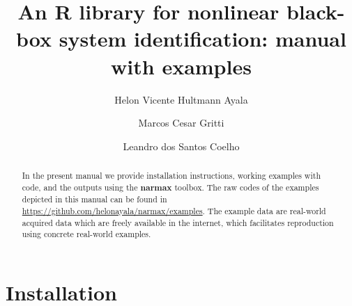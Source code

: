 \documentclass[preprint,12pt, a4paper]{elsarticle}
\begin{document}
\begin{frontmatter}

\title{An \textbf{R} library for nonlinear black-box system identification: manual with examples}

\author[pucrio,ppgeps]{Helon Vicente Hultmann Ayala}
\author[ufpr]{Marcos Cesar Gritti}
\author[ppgeps,ufpr]{Leandro dos Santos Coelho}
\address[pucrio]{Department of Mechanical Engineering, Pontifical Catholic University of Rio de Janeiro (PUC-Rio)\\ Marques de Sao Vicente, 225, Zip code 22453-900, Rio de Janeiro, RJ, Brazil}
\address[ppgeps]{Industrial and Systems Engineering Graduate Program (PPGEPS), Pontifical Catholic University of Parana (PUCPR)\\ Imaculada Conceicao, 1155, Zip code 80215-901, Curitiba, PR, Brazil}
\address[ufpr]{Department of Electrical Engineering, Federal University of Parana (UFPR)\\ Cel. Francisco Heraclito dos Santos, 100, Zip code 81531-980 Curitiba, PR, Brazil}

\begin{abstract}
	In the present manual we provide installation instructions, working examples with code, and the outputs using the \textbf{narmax} toolbox. The raw codes of the examples depicted in this manual can be found in \url{https://github.com/helonayala/narmax/examples}. The example data are real-world acquired data which are freely available in the internet, which facilitates reproduction using concrete real-world examples. 
\end{abstract}

\end{frontmatter}

\section{Installation}
\end{document}
